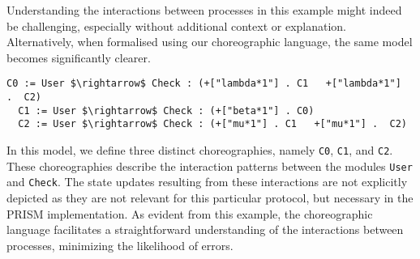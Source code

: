Understanding the interactions between processes in this example might
indeed be challenging, especially without additional context or
explanation.  Alternatively, when formalised using our choreographic
language, the same model becomes significantly clearer.
\begin{lstlisting}[style=chor-color,% caption={Example of Listing \ref{example1} in our choreographic language},captionpos=b,
  frame=none, label={example2}]
  C0 := User $\rightarrow$ Check : (+["lambda*1"] . C1	 +["lambda*1"]  .  C2)
  C1 := User $\rightarrow$ Check : (+["beta*1"] . C0)  
  C2 := User $\rightarrow$ Check : (+["mu*1"] . C1   +["mu*1"] .  C2)
\end{lstlisting}
In this model, we define three distinct choreographies, namely
\texttt{C0}, \texttt{C1}, and \texttt{C2}. These choreographies
describe the interaction patterns between the modules \texttt{User}
and \texttt{Check}. The state updates resulting from these
interactions are not explicitly depicted as they are not relevant for
this particular protocol, but necessary in the PRISM implementation.
%
As evident from this example, the choreographic language facilitates a
straightforward understanding of the interactions between processes,
minimizing the likelihood of errors.



